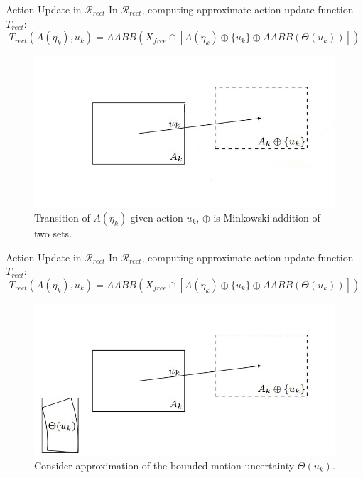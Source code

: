 \documentclass[10pt]{beamer}
\begin{document}
\begin{frame} {Action Update in $\mathcal{R}_{rect}$}
  In $\mathcal{R}_{rect}$, computing approximate action update function $T_{rect} :$\\
  $$T_{rect}(A(\eta_k), u_k) = AABB(X_{free} \cap [A(\eta_k) \oplus \{ u_k \} \oplus AABB(\Theta(u_k))])$$
  \begin{figure}
    \includegraphics[scale=0.35]{figs/t_rect.jpg}
    \caption{Transition of $A(\eta_k)$ given action $u_k$, $\oplus$ is Minkowski addition of two sets.}
  \end{figure}
\end{frame}

\begin{frame}{Action Update in $\mathcal{R}_{rect}$}
  In $\mathcal{R}_{rect}$, computing approximate action update function $T_{rect} :$\\
  $$T_{rect}(A(\eta_k), u_k) = AABB(X_{free} \cap [A(\eta_k) \oplus \{ u_k \} \oplus AABB(\Theta(u_k))])$$
  \begin{figure}
    \includegraphics[scale=0.35]{figs/t_rect2.jpg}
    \caption{Consider approximation of the bounded motion uncertainty $\Theta(u_k)$.}
  \end{figure}
\end{frame}
\end{document}
